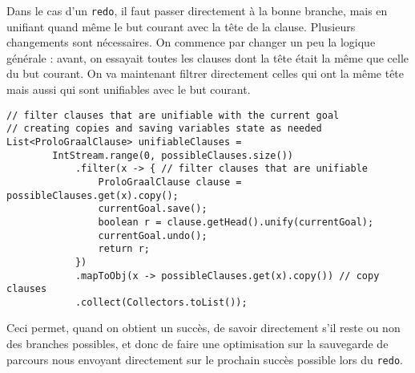 \documentclass[../report.tex]{subfiles}
\begin{document}
Dans le cas d'un \texttt{redo}, il faut passer directement à la bonne branche, mais en unifiant quand même le but courant avec la tête de la clause. Plusieurs changements sont nécessaires. On commence par changer un peu la logique générale : avant, on essayait toutes les clauses dont la tête était la même que celle du but courant. On va maintenant filtrer directement celles qui ont la même tête mais aussi qui sont unifiables avec le but courant.
\begin{verbatim}
// filter clauses that are unifiable with the current goal
// creating copies and saving variables state as needed
List<ProloGraalClause> unifiableClauses =
        IntStream.range(0, possibleClauses.size())
            .filter(x -> { // filter clauses that are unifiable
                ProloGraalClause clause = possibleClauses.get(x).copy();
                currentGoal.save();
                boolean r = clause.getHead().unify(currentGoal);
                currentGoal.undo();
                return r;
            })
            .mapToObj(x -> possibleClauses.get(x).copy()) // copy clauses
            .collect(Collectors.toList());
\end{verbatim}
Ceci permet, quand on obtient un succès, de savoir directement s'il reste ou non des branches possibles, et donc de faire une optimisation sur la sauvegarde de parcours nous envoyant directement sur le prochain succès possible lors du \texttt{redo}. 
\end{document}
